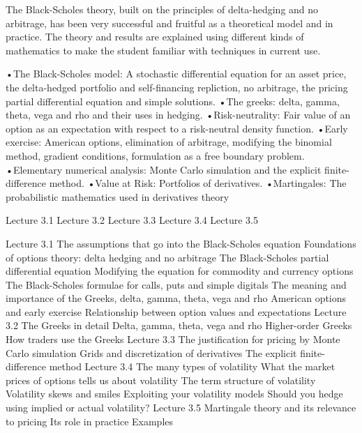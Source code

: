 
The Black-Scholes theory, built on the principles of delta-hedging and no arbitrage, has been very successful and fruitful as a theoretical model and in practice. The theory and results are explained using different kinds of mathematics to make the student familiar with techniques in current use.
 
•The Black-Scholes model: A stochastic differential equation for an asset price, the delta-hedged portfolio and self-financing repliction, no arbitrage, the pricing partial differential equation and simple solutions.
•The greeks: delta, gamma, theta, vega and rho and their uses in hedging.
•Risk-neutrality: Fair value of an option as an expectation with respect to a risk-neutral density function.
•Early exercise: American options, elimination of arbitrage, modifying the binomial method, gradient conditions, formulation as a free boundary problem.
•Elementary numerical analysis: Monte Carlo simulation and the explicit finite-difference method.
•Value at Risk: Portfolios of derivatives.
•Martingales: The probabilistic mathematics used in derivatives theory
 

Lecture 3.1
Lecture 3.2
Lecture 3.3
Lecture 3.4
Lecture 3.5
 
Lecture 3.1
The assumptions that go into the Black-Scholes equation
Foundations of options theory: delta hedging and no arbitrage
The Black-Scholes partial differential equation
Modifying the equation for commodity and currency options
The Black-Scholes formulae for calls, puts and simple digitals
The meaning and importance of the Greeks, delta, gamma, theta, vega and rho
American options and early exercise
Relationship between option values and expectations
Lecture 3.2
The Greeks in detail
Delta, gamma, theta, vega and rho
Higher-order Greeks
How traders use the Greeks
Lecture 3.3
The justification for pricing by Monte Carlo simulation
Grids and discretization of derivatives
The explicit finite-difference method
Lecture 3.4
The many types of volatility
What the market prices of options tells us about volatility
The term structure of volatility
Volatility skews and smiles
Exploiting your volatility models
Should you hedge using implied or actual volatility?
Lecture 3.5
Martingale theory and its relevance to pricing
Its role in practice
Examples
